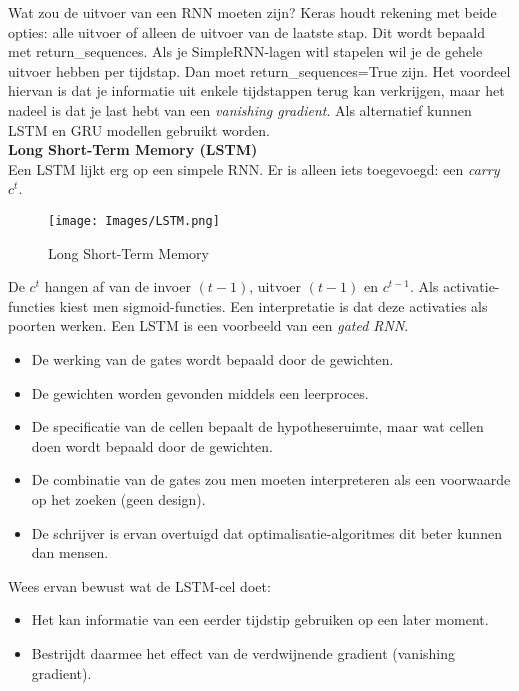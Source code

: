 {\noindent Wat zou de uitvoer van een RNN moeten zijn? {\selectfont Keras} houdt rekening met beide opties: alle uitvoer of alleen de uitvoer van de laatste stap. Dit wordt bepaald met {\selectfont return\_sequences}. Als je {\selectfont SimpleRNN}-lagen witl stapelen wil je de gehele uitvoer hebben per tijdstap. Dan moet {\selectfont return\_sequences}={\selectfont True} zijn. Het voordeel hiervan is dat je informatie uit enkele tijdstappen terug kan verkrijgen, maar het nadeel is dat je last hebt van een \textit{vanishing gradient}. Als alternatief kunnen LSTM en GRU modellen gebruikt worden. \\

\textbf{Long Short-Term Memory (LSTM)}\\
Een LSTM lijkt erg op een simpele RNN. Er is alleen iets toegevoegd: een \textit{carry} $c^t$.
\begin{figure}[h]
    \centering
    \texttt{[image: Images/LSTM.png]}
    \caption{Long Short-Term Memory}
    \label{fig:my_label}
\end{figure}

\noindent De $c^t$ hangen af van de invoer $(t-1)$, uitvoer $(t-1)$ en $c^{t-1}$. Als activatie-functies kiest men sigmoid-functies. Een interpretatie is dat deze activaties als poorten werken. Een LSTM is een voorbeeld van een \textit{gated RNN}.

\begin{itemize}
    \item De werking van de gates wordt bepaald door de gewichten.
    \item De gewichten worden gevonden middels een leerproces.
    \item De specificatie van de cellen bepaalt de hypotheseruimte, maar wat cellen doen wordt bepaald door de gewichten.
    \item De combinatie van de gates zou men moeten interpreteren als een voorwaarde op het zoeken (geen design).
    \item De schrijver is ervan overtuigd dat optimalisatie-algoritmes dit beter kunnen dan mensen.
\end{itemize}

\noindent Wees ervan bewust wat de LSTM-cel doet:
\begin{itemize}
    \item Het kan informatie van een eerder tijdstip gebruiken op een later moment.
    \item Bestrijdt daarmee het effect van de verdwijnende gradient (vanishing gradient).
\end{itemize}

}
